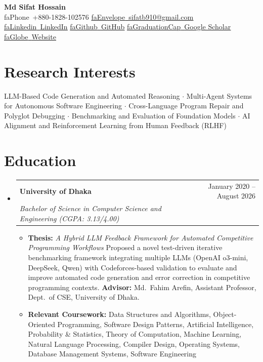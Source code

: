 \documentclass[a4paper,9.5pt]{article}
\makeatletter
\newcommand{\seticon}[1]{{\csname #1\endcsname}}
\newcommand{\resumeItem}[1]{
  \item\small{#1\vspace{-2pt}}
}
\newcommand{\resumeSubheading}[4]{
  \vspace{-1pt}\item
    \begin{tabular*}{0.97\textwidth}[t]{l@{\extracolsep{\fill}}r}
      \textbf{#1} & #2 \\
      \textit{\small#3} & \textit{\small #4} \\
    \end{tabular*}\vspace{-5pt}
}
\newcommand{\resumeSubHeadingListStart}{\begin{itemize}[leftmargin=0.15in, label={}]}
\newcommand{\resumeSubHeadingListEnd}{\end{itemize}}
\newcommand{\resumeItemListStart}{\begin{itemize}}
\newcommand{\resumeItemListEnd}{\end{itemize}\vspace{-5pt}}
\makeatother
\begin{document}
\begin{center}
    \textbf{\Large Md Sifat Hossain} \\[0.4em]
    \small
    \seticon{faPhone}~+880-1828-102576 \hspace{0.6em}
    \href{mailto:sifatb910@gmail.com}{\seticon{faEnvelope}~\underline{sifatb910@gmail.com}} \hspace{0.6em}
    \href{https://www.linkedin.com/in/md-sifat-hossain-niloy/}{\seticon{faLinkedin}~\underline{LinkedIn}} \hspace{0.6em}
    \href{https://github.com/sifat-hossain-niloy}{\seticon{faGithub}~\underline{GitHub}} \hspace{0.6em}
    \href{https://scholar.google.com/citations?user=ufzmCDQAAAAJ&hl=en}{\seticon{faGraduationCap}~\underline{Google Scholar}} \hspace{0.6em}
    \href{https://mdsifathossain.com}{\seticon{faGlobe}~\underline{Website}}
\end{center}
\vspace{-8pt}

\section{Research Interests}
\small{
LLM-Based Code Generation and Automated Reasoning $\cdot$
Multi-Agent Systems for Autonomous Software Engineering $\cdot$
Cross-Language Program Repair and Polyglot Debugging $\cdot$
Benchmarking and Evaluation of Foundation Models $\cdot$
AI Alignment and Reinforcement Learning from Human Feedback (RLHF)
}

\section{Education}
\resumeSubHeadingListStart
    \resumeSubheading
    {University of Dhaka}{January 2020 -- August 2026}
    {Bachelor of Science in Computer Science and Engineering \textnormal{(CGPA: 3.13/4.00)}}{}
    \resumeItemListStart
        \resumeItem{\textbf{Thesis:} \textit{A Hybrid LLM Feedback Framework for Automated Competitive Programming Workflows} \newline Proposed a novel test-driven iterative benchmarking framework integrating multiple LLMs (OpenAI o3-mini, DeepSeek, Qwen) with Codeforces-based validation to evaluate and improve automated code generation and error correction in competitive programming contexts. \newline \textbf{Advisor:} Md.~Fahim Arefin, Assistant Professor, Dept.\ of CSE, University of Dhaka.}
        \resumeItem{\textbf{Relevant Coursework:} Data Structures and Algorithms, Object-Oriented Programming, Software Design Patterns, Artificial Intelligence, Probability \& Statistics, Theory of Computation, Machine Learning, Natural Language Processing, Compiler Design, Operating Systems, Database Management Systems, Software Engineering}
    \resumeItemListEnd
\resumeSubHeadingListEnd
\end{document}
